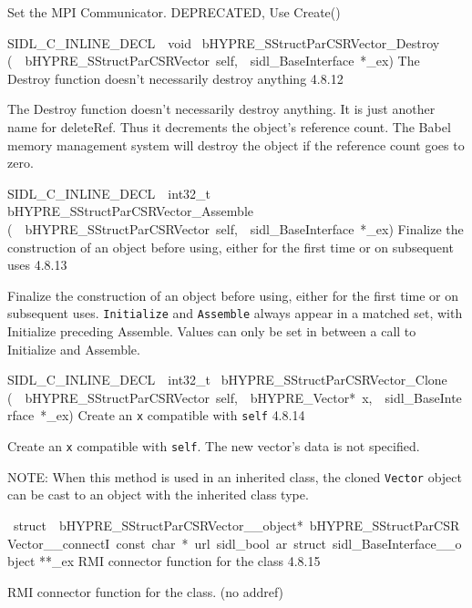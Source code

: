 \documentclass{article}
\begin{document}
\begin{cxxentry}
\begin{cxxentry}
\begin{cxxfunction}
\begin{cxxdoc}
Set the MPI Communicator.  DEPRECATED, Use Create()
\end{cxxdoc}
\end{cxxfunction}
\begin{cxxfunction}
{SIDL\_C\_INLINE\_DECL\ \ void\ }
        {bHYPRE\_SStructParCSRVector\_Destroy}
        {(\ \ bHYPRE\_SStructParCSRVector\ self,\ \ sidl\_BaseInterface\ *\_ex)}
        {
The Destroy function doesn't necessarily destroy anything}
        {4.8.12}
\begin{cxxdoc}

The Destroy function doesn't necessarily destroy anything.
It is just another name for deleteRef.  Thus it decrements the
object's reference count.  The Babel memory management system will
destroy the object if the reference count goes to zero.
\end{cxxdoc}
\end{cxxfunction}
\begin{cxxfunction}
{SIDL\_C\_INLINE\_DECL\ \ int32\_t\ }
        {bHYPRE\_SStructParCSRVector\_Assemble}
        {(\ \ bHYPRE\_SStructParCSRVector\ self,\ \ sidl\_BaseInterface\ *\_ex)}
        {
Finalize the construction of an object before using, either
for the first time or on subsequent uses}
        {4.8.13}
\begin{cxxdoc}

Finalize the construction of an object before using, either
for the first time or on subsequent uses. {\tt Initialize}
and {\tt Assemble} always appear in a matched set, with
Initialize preceding Assemble. Values can only be set in
between a call to Initialize and Assemble.
\end{cxxdoc}
\end{cxxfunction}
\begin{cxxfunction}
{SIDL\_C\_INLINE\_DECL\ \ int32\_t\ }
        {bHYPRE\_SStructParCSRVector\_Clone}
        {(\ \ bHYPRE\_SStructParCSRVector\ self,\ \ bHYPRE\_Vector*\ x,\ \ sidl\_BaseInterface\ *\_ex)}
        {
Create an {\tt x} compatible with {\tt self}}
        {4.8.14}
\begin{cxxdoc}

Create an {\tt x} compatible with {\tt self}.
The new vector's data is not specified.

NOTE: When this method is used in an inherited class, the
cloned {\tt Vector} object can be cast to an object with the
inherited class type.
\end{cxxdoc}
\end{cxxfunction}
\begin{cxxvariable}
{\ struct\ \ bHYPRE\_SStructParCSRVector\_\_object*\ bHYPRE\_SStructParCSRVector\_\_connectI\ const\ char\ *\ url\ sidl\_bool\ ar\ struct\ sidl\_BaseInterface\_\_object}
        {**\_ex}
        {}
        {
RMI connector function for the class}
        {4.8.15}
\begin{cxxdoc}

RMI connector function for the class. (no addref)
\end{cxxdoc}
\end{cxxvariable}
\end{cxxentry}
\end{cxxentry}
\end{document}
